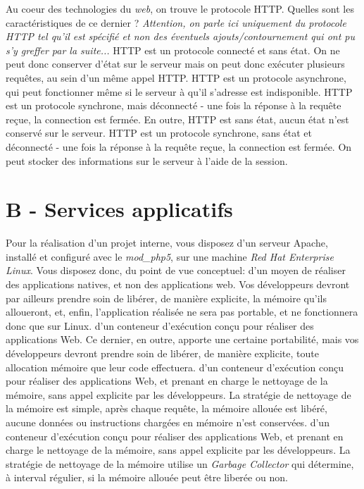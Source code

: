 \documentclass[a4paper,10pt]{article}
\begin{document}
\begin{question}{Au coeur des technologies du \textit{web}, on trouve le protocole HTTP. Quelles
sont les caractéristiques de ce dernier ? \textit{Attention, on parle ici uniquement du protocole
HTTP tel qu'il est spécifié et non des éventuels ajouts/contournement qui ont pu s'y greffer par la
suite...}}
  \false HTTP est un protocole connecté et sans état. On ne peut donc conserver d'état sur le
  serveur mais on peut donc exécuter plusieurs requêtes, au sein d'un même appel HTTP.
  \false HTTP est un protocole asynchrone, qui peut fonctionner même si le serveur à qu'il s'adresse
  est indisponible.
  \true HTTP est un protocole synchrone, mais déconnecté - une fois la réponse à la requête reçue,
  la connection est fermée. En outre, HTTP est sans état, aucun état n'est conservé sur le serveur.
  \true HTTP est un protocole synchrone, sans état et déconnecté - une fois la réponse à la requête
  reçue, la connection est fermée. On peut stocker des informations sur le serveur à l'aide de la
  session.
\end{question}

\section{B - Services applicatifs}

\begin{question}{Pour la réalisation d'un projet interne, vous disposez d'un serveur Apache,
installé et configuré avec le \textit{mod\_php5}, sur une machine \textit{Red Hat Enterprise Linux}.
Vous disposez donc, du point de vue conceptuel:}
  \false d'un moyen de réaliser des applications natives, et non des applications web. Vos
  développeurs devront par ailleurs prendre soin de libérer, de manière explicite, la mémoire qu'ils
  alloueront, et, enfin, l'application réalisée ne sera pas portable, et ne fonctionnera donc que
  sur Linux.
  \false d'un conteneur d'exécution conçu pour réaliser des applications Web. Ce dernier, en outre,
  apporte une certaine portabilité, mais vos développeurs devront prendre soin de libérer, de manière explicite,
  toute allocation mémoire que leur code effectuera.
  \true d'un conteneur d'exécution conçu pour réaliser des applications Web, et prenant en charge le
  nettoyage de la mémoire, sans appel explicite par les développeurs. La stratégie de nettoyage de
  la mémoire est simple, après chaque requête, la mémoire allouée est libéré, aucune données ou
  instructions chargées en mémoire n'est conservées.
  \true d'un conteneur d'exécution conçu pour réaliser des applications Web, et prenant en charge le
  nettoyage de la mémoire, sans appel explicite par les développeurs. La stratégie de nettoyage de
  la mémoire utilise un \textit{Garbage Collector} qui détermine, à interval régulier, si la mémoire
  allouée peut être liberée ou non.
\end{question}
\end{document}
